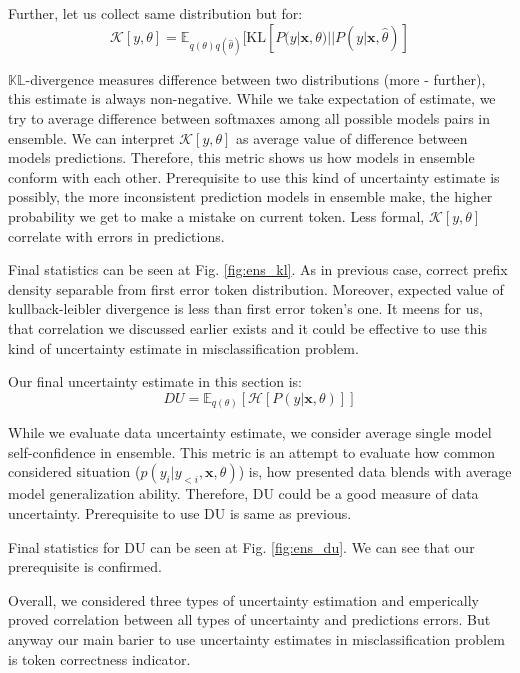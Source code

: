 \documentclass[a4paper,14pt]{extarticle}
\begin{document}
	Further, let us collect same distribution but for:
	\begin{equation*}
		\mathcal{K}[y, \theta] = \mathbb{E}_{q(\theta)q(\hat{\theta})}[
			\mathrm{KL}[P(y|\textbf{x}, \theta) || P(y|\textbf{x}, \hat{\theta})
		]
	\end{equation*}
	
	$\mathbb{KL}$-divergence measures difference between two distributions (more - further), this estimate is always non-negative. While we take expectation of estimate, we try to average difference between softmaxes among all possible models pairs in ensemble. We can interpret $\mathcal{K}[y, \theta]$ as average value of difference between models predictions. Therefore, this metric shows us how models in ensemble conform with each other. Prerequisite to use this kind of uncertainty estimate is possibly, the more inconsistent prediction models in ensemble make, the higher probability we get to make a mistake on current token. Less formal, $\mathcal{K}[y, \theta]$ correlate with errors in predictions.
	
	Final statistics can be seen at Fig. \ref{fig:ens_kl}. As in previous case, correct prefix density separable from first error token distribution. Moreover, expected value of kullback-leibler divergence is less than first error token's one. It meens for us, that correlation we discussed earlier exists and it could be effective to use this kind of uncertainty estimate in misclassification problem. 
	
	Our final uncertainty estimate in this section is:
	\begin{equation*}
		DU = \mathbb{E}_{q(\theta)}[\mathcal{H}[P(y| \textbf{x}, \theta)]]
	\end{equation*}
	
	While we evaluate data uncertainty estimate, we consider average single model self-confidence in ensemble. This metric is an attempt to evaluate how common considered situation ($p(y_i | y_{<i}, \textbf{x}, \theta)$) is, how presented data blends with average model generalization ability. Therefore, DU could be a good measure of data uncertainty. Prerequisite to use DU is same as previous.
	
	Final statistics for DU can be seen at Fig. \ref{fig:ens_du}. We can see that our prerequisite is confirmed.
	
	Overall, we considered three types of uncertainty estimation and emperically proved correlation between all types of uncertainty and predictions errors. But anyway our main barier to use uncertainty estimates in misclassification problem is token correctness indicator.
	
\end{document}
